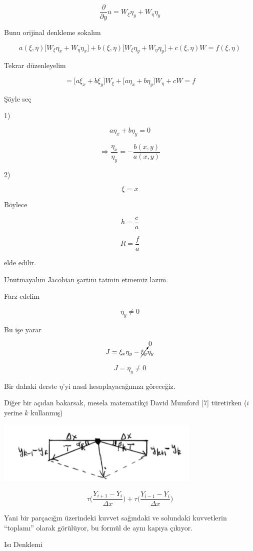 \documentclass[12pt,fleqn]{article}\usepackage{../../common}
\begin{document}
$$ \frac{\partial }{\partial y}u =
W_\xi\eta_y + W_\eta\eta_y
 $$

Bunu orijinal denkleme sokalım 

$$ 
a(\xi,\eta) \bigg[W_\xi \eta_x + W_\eta\eta_x \bigg] +
b(\xi,\eta) \bigg[W_\xi \eta_y + W_\eta\eta_y  \bigg] + 
c(\xi,\eta)W = f(\xi,\eta)
 $$

Tekrar düzenleyelim

$$ = 
\bigg[ a\xi_x + b\xi_y \bigg] W_\xi + 
\bigg[ a\eta_x + b\eta_y \bigg] W_\eta +
cW = f
 $$

Şöyle seç

1)

$$ a \eta_x + b \eta_y = 0 $$

$$ \Rightarrow \frac{\eta_x}{\eta_y} = -\frac{b(x,y)}{a(x,y)}$$

2)

$$ \xi = x $$

Böylece 

$$ h = \frac{c}{a} $$

$$ R = \frac{f}{a} $$

elde edilir. 

Unutmayalım Jacobian şartını tatmin etmemiz lazım. 

Farz edelim 

$$ \eta_y \ne 0 $$

Bu işe yarar 

$$ J = \xi_x\eta_y - \cancelto{0}{\xi_y}\eta_y $$

$$ J = \eta_y \ne 0 $$

Bir dahaki derste $\eta$'yi nasıl hesaplayacağımızı göreceğiz. 

Diğer bir açıdan bakarsak, mesela matematikçi David Mumford [7] türetirken ($i$
yerine $k$ kullanmış)

\includegraphics[height=3cm]{1_15.png}

$$ 
\tau \bigg( \frac{Y_{i+1}- Y_i}{\Delta x} \bigg) +
\tau \bigg( \frac{Y_{i-1}- Y_{i}}{\Delta x} \bigg) 
$$

Yani bir parçacığın üzerindeki kuvvet sağındaki ve solundaki kuvvetlerin
``toplamı'' olarak görülüyor, bu formül de aynı kapıya çıkıyor.

Isı Denklemi
\end{document}
